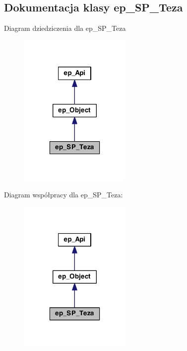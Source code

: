 \hypertarget{classep___s_p___teza}{\subsection{Dokumentacja klasy ep\-\_\-\-S\-P\-\_\-\-Teza}
\label{classep___s_p___teza}
}


Diagram dziedziczenia dla ep\-\_\-\-S\-P\-\_\-\-Teza\nopagebreak
\begin{figure}[H]
\begin{center}
\leavevmode
\includegraphics[width=154pt]{classep___s_p___teza__inherit__graph}
\end{center}
\end{figure}


Diagram współpracy dla ep\-\_\-\-S\-P\-\_\-\-Teza\-:\nopagebreak
\begin{figure}[H]
\begin{center}
\leavevmode
\includegraphics[width=154pt]{classep___s_p___teza__coll__graph}
\end{center}
\end{figure}
